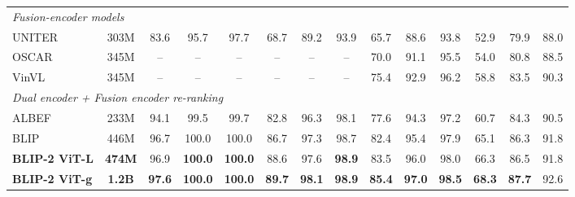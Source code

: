 \begin{enrichment}
\begin{enrichment}
\begin{table}[H]
\begin{tabular}{lccccccccccccc}
                \midrule
                \multicolumn{14}{l}{\emph{Fusion-encoder models}} \\
                UNITER~\cite{chen2020_uniter}     & 303M  & 83.6 & 95.7 & 97.7 & 68.7 & 89.2 & 93.9 & 65.7 & 88.6 & 93.8 & 52.9 & 79.9 & 88.0 \\
                OSCAR~\cite{li2020_oscar}         & 345M  & --   & --   & --   & --   & --   & --   & 70.0 & 91.1 & 95.5 & 54.0 & 80.8 & 88.5 \\
                VinVL~\cite{zhang2021_vinvl}      & 345M  & --   & --   & --   & --   & --   & --   & 75.4 & 92.9 & 96.2 & 58.8 & 83.5 & 90.3 \\
                \midrule
                \multicolumn{14}{l}{\emph{Dual encoder + Fusion encoder re-ranking}} \\
                ALBEF~\cite{li2021_albef}         & 233M  & 94.1 & 99.5 & 99.7 & 82.8 & 96.3 & 98.1 & 77.6 & 94.3 & 97.2 & 60.7 & 84.3 & 90.5 \\
                BLIP~\cite{li2022_blip}           & 446M  & 96.7 & 100.0 & 100.0 & 86.7 & 97.3 & 98.7 & 82.4 & 95.4 & 97.9 & 65.1 & 86.3 & 91.8 \\
                \textbf{BLIP-2 ViT-L}             & \textbf{474M}  & {96.9} & \textbf{100.0} & \textbf{100.0} & {88.6} & {97.6} & \textbf{98.9} & {83.5} & {96.0} & {98.0} & {66.3} & {86.5} & {91.8} \\
                \textbf{BLIP-2 ViT-g}             & \textbf{1.2B}  & \textbf{97.6} & \textbf{100.0} & \textbf{100.0} & \textbf{89.7} & \textbf{98.1} & \textbf{98.9} & \textbf{85.4} & \textbf{97.0} & \textbf{98.5} & \textbf{68.3} & \textbf{87.7} & {92.6} \\
                \bottomrule
            \end{tabular}
        \end{table}
        

\end{enrichment}
\end{enrichment}

